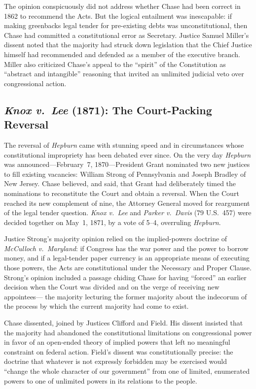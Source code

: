 \documentclass[12pt]{article}
\begin{document}
The opinion conspicuously did not address whether Chase had been correct
in 1862 to recommend the Acts.  But the logical entailment was
inescapable: if making greenbacks legal tender for pre-existing debts
was unconstitutional, then Chase had committed a constitutional error as
Secretary.  Justice Samuel Miller's dissent noted that the majority had struck down legislation that the
Chief Justice himself had recommended and defended as a member of the
executive branch.  Miller also criticized Chase's appeal to the
``spirit'' of the Constitution as ``abstract and intangible'' reasoning
that invited an unlimited judicial veto over congressional action.

\subsection{\textit{Knox v.\ Lee} (1871): The Court-Packing Reversal}

The reversal of \textit{Hepburn} came with stunning speed and in
circumstances whose constitutional impropriety has been debated ever
since.  On the very day \textit{Hepburn} was announced---February~7,
1870---President Grant nominated two new justices to fill existing
vacancies: William Strong of Pennsylvania and Joseph Bradley of New
Jersey.  Chase believed, and said, that Grant had deliberately timed
the nominations to reconstitute the Court and obtain a reversal.  When
the Court reached its new complement of nine, the Attorney General moved
for reargument of the legal tender question.  \textit{Knox v.\ Lee} and
\textit{Parker v.\ Davis} (79 U.S.\ 457) were decided together on
May~1, 1871, by a vote of 5--4, overruling \textit{Hepburn}.

Justice Strong's majority opinion relied on the implied-powers doctrine
of \textit{McCulloch v.\ Maryland}: if Congress has the war power and
the power to borrow money, and if a legal-tender paper currency is an
appropriate means of executing those powers, the Acts are constitutional
under the Necessary and Proper Clause.  Strong's opinion included a passage chiding Chase for having ``forced'' an earlier decision when
the Court was divided and on the verge of receiving new appointees---
the majority lecturing the former majority about the indecorum of the
process by which the current majority had come to exist.

Chase dissented, joined by Justices Clifford and Field.  His dissent
insisted that the majority had abandoned the constitutional limitations
on congressional power in favor of an open-ended theory of implied
powers that left no meaningful constraint on federal action.  Field's
dissent was constitutionally precise:
the doctrine that whatever is not expressly forbidden may be exercised
would ``change the whole character of our government'' from one of
limited, enumerated powers to one of unlimited powers in its relations
to the people.
\end{document}
